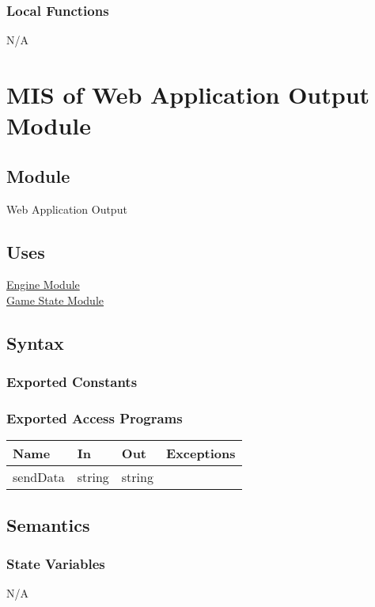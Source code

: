 \documentclass[12pt, titlepage]{article}
\begin{document}
    \subsubsection{Local Functions}
    N/A

    \newpage

\section{MIS of Web Application Output Module} \label{mOutput}

    \subsection{Module}
    Web Application Output

    \subsection{Uses}
    \hyperref[mEngine]{Engine Module}\\
    \hyperref[mGame]{Game State Module}

    \subsection{Syntax}
    \subsubsection{Exported Constants}

    \subsubsection{Exported Access Programs}
        \begin{center}
        \begin{tabular}{p{4.5cm} p{4cm} p{3cm} p{2.5cm}}
        \hline
        \textbf{Name} & \textbf{In} & \textbf{Out} & \textbf{Exceptions} \\
        \hline
        sendData & string & string & \\
        \hline
        \end{tabular}
        \end{center}

    \subsection{Semantics}
    \subsubsection{State Variables}
    N/A
\end{document}
